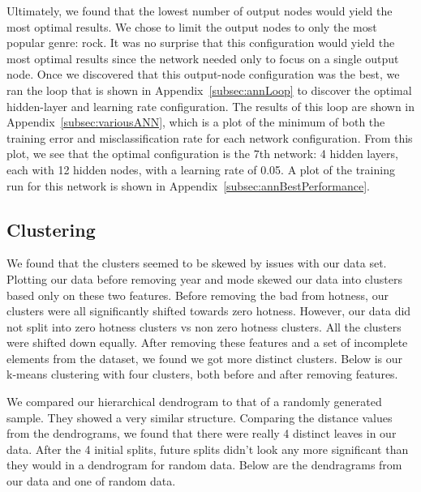\documentclass[12pt]{article}
\begin{document}
Ultimately, we found that the lowest number of output nodes would yield the most optimal results. We chose to limit the output nodes to only the most popular genre: rock. It was no surprise that this configuration would yield the most optimal results since the network needed only to focus on a single output node. Once we discovered that this output-node configuration was the best, we ran the loop that is shown in Appendix~\ref{subsec:annLoop} to discover the optimal hidden-layer and learning rate configuration. The results of this loop are shown in Appendix~\ref{subsec:variousANN}, which is a plot of the minimum of both the training error and misclassification rate for each network configuration. From this plot, we see that the optimal configuration is the 7th network: 4 hidden layers, each with 12 hidden nodes, with a learning rate of 0.05. A plot of the training run for this network is shown in Appendix~\ref{subsec:annBestPerformance}.


\subsection{Clustering}
\label{subsec:clusteringResults}
We found that the clusters seemed to be skewed by issues with our data set. Plotting our data before removing year and mode skewed our data into clusters based only on these two features. Before removing the bad from hotness, our clusters were all significantly shifted towards zero hotness. However, our data did not split into zero hotness clusters vs non zero hotness clusters. All the clusters were shifted down equally. After removing these features and a set of incomplete elements from the dataset, we found we got more distinct clusters. Below is our k-means clustering with four clusters, both before and after removing features.


We compared our hierarchical dendrogram to that of a randomly generated sample. They showed a very similar structure. Comparing the distance values from the dendrograms, we found that there were really 4 distinct leaves in our data. After the 4 initial splits, future splits didn't look any more significant than they would in a dendrogram for random data. Below are the dendragrams from our data and one of random data.



\end{document}
